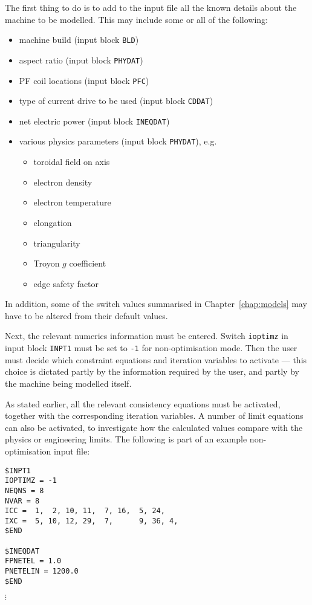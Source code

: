 \documentclass[11pt,a4paper]{report}
\begin{document}
The first thing to do is to add to the input file all the known details about
the machine to be modelled. This may include some or all of the following:
\begin{itemize}
\item machine build (input block {\tt BLD})
\item aspect ratio (input block {\tt PHYDAT})
\item PF coil locations (input block {\tt PFC})
\item type of current drive to be used (input block {\tt CDDAT})
\item net electric power (input block {\tt INEQDAT})
\item various physics parameters (input block {\tt PHYDAT}), e.g.
\begin{itemize}
\item toroidal field on axis
\item electron density
\item electron temperature
\item elongation
\item triangularity
\item Troyon $g$ coefficient
\item edge safety factor
\end{itemize}
\end{itemize}

In addition, some of the switch values summarised in Chapter~\ref{chap:models}
may have to be altered from their default values.

Next, the relevant numerics information must be entered. Switch {\tt ioptimz}
in input block {\tt INPT1} must be set to {\tt -1} for non-optimisation
mode. Then the user must decide which constraint equations and iteration
variables to activate --- this choice is dictated partly by the information
required by the user, and partly by the machine being modelled itself.

As stated earlier, all the relevant consistency equations must be activated,
together with the corresponding iteration variables. A number of limit
equations can also be activated, to investigate how the calculated values
compare with the physics or engineering limits.  The following is part of an
example non-optimisation input file:
\begin{verbatim}
$INPT1
IOPTIMZ = -1
NEQNS = 8
NVAR = 8
ICC =  1,  2, 10, 11,  7, 16,  5, 24,
IXC =  5, 10, 12, 29,  7,      9, 36, 4,
$END

$INEQDAT
FPNETEL = 1.0
PNETELIN = 1200.0
$END
\end{verbatim}
\vspace{-8mm}
$\vdots$
\end{document}
